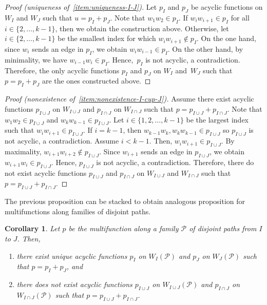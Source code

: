 \documentclass[11pt]{article}
\newtheorem{coro}[theo]{Corollary}
\theoremstyle{definition}
\numberwithin{equation}{section}
\begin{document}
\begin{proof}[Proof (uniqueness of~\ref{item:uniqueness-I-J})]
    Let \(p_I\) and \(p_J\) be acyclic functions on \(W_I\) and \(W_J\) such that \(u = p_I + p_J\).
    Note that \(w_1 w_2 \in p_I\).
    If \(w_i w_{i+1} \in p_I\) for all \(i \in \{2, \dots, k-1\}\), then we obtain the construction above.
    Otherwise, let \(i \in \{2, \dots, k-1\}\) be the smallest index for which \(w_i w_{i+1} \notin p_I\).
    On the one hand, since \(w_i\) sends an edge in \(p_I\), we obtain \(w_i w_{i-1} \in p_I\).
    On the other hand, by minimality, we have \(w_{i - 1} w_i \in p_I\).
    Hence,~\(p_I\) is not acyclic, a contradiction.
    Therefore, the only acyclic functions \(p_I\) and \(p_J\) on \(W_I\) and~\(W_J\) such that \(p = p_I + p_J\) are the ones constructed above.
\end{proof}

\begin{proof}[Proof (nonexistence of~\ref{item:nonexistence-I-cup-J})]
    Assume there exist acyclic functions \(p_{I \cup J}\) on \(W_{I \cup J}\) and \(p_{I \cap J}\) on \(W_{I \cap J}\) such that \(p = p_{I \cup J} + p_{I \cap J}\).
    Note that \(w_1 w_2 \in p_{I \cup J}\) and \(w_{k} w_{k-1} \in p_{I \cup J}\).
    Let \(i \in \{1, 2, \dots, k-1\}\) be the largest index such that \(w_i w_{i+1} \in p_{I \cup J}\).
    If \(i = k-1\), then \(w_{k-1} w_k, w_k w_{k-1} \in p_{I \cup J}\) so \(p_{I \cup J}\) is not acyclic, a contradiction.
    Assume \(i < k-1\).
    Then, \(w_i w_{i+1} \in p_{I \cup J}\).
    By maximality, \(w_{i+1} w_{i+2} \notin p_{I \cup J}\).
    Since \(w_{i+1}\) sends an edge in \(p_{I \cup J}\), we obtain \(w_{i+1} w_i \in p_{I \cup J}\).
    Hence, \(p_{I \cup J}\) is not acyclic, a contradiction.
    Therefore, there do not exist acyclic functions \(p_{I \cup J}\) and \(p_{I \cap J}\) on \(W_{I \cup J}\) and \(W_{I \cap J}\) such that \(p = p_{I \cup J} + p_{I \cap J}\).
\end{proof}

The previous proposition can be stacked to obtain analogous proposition for multifunctions along families of disjoint paths.

\begin{coro} \label{corollary:disjointpaths}
    Let \(p\) be the multifunction along a family \(\mathcal{P}\) of disjoint paths from \(I\) to \(J\).
    Then,
    \begin{enumerate}[label=(\roman*)]
        \item there exist unique acyclic functions \(p_I\) on \(W_I(\mathcal{P})\) and \(p_J\) on \(W_J(\mathcal{P})\) such that \(p = p_I + p_J\), and
        \item there does not exist acyclic functions \(p_{I \cup J}\) on \(W_{I \cup J}(\mathcal{P})\) and \(p_{I \cap J}\) on \(W_{I \cap J}(\mathcal{P})\) such that \(p = p_{I \cup J} + p_{I \cap J}\).
    \end{enumerate}
\end{coro}
\end{document}
